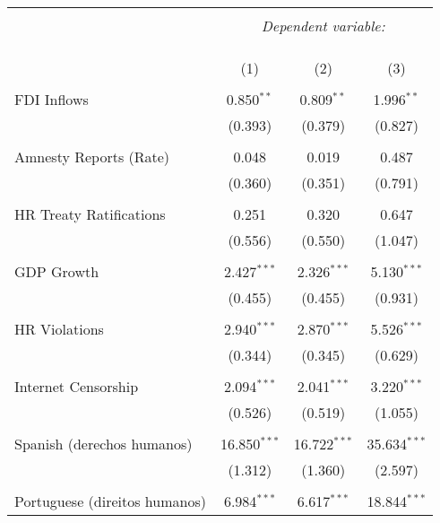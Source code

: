 
\begin{table}[!htbp] \centering 
  \caption{} 
  \label{} 
\begin{tabular}{@{\extracolsep{5pt}}lccc} 
\\[-1.8ex]\hline 
\hline \\[-1.8ex] 
 & \multicolumn{3}{c}{\textit{Dependent variable:}} \\ 
\cline{2-4} 
\\[-1.8ex] & \multicolumn{3}{c}{ } \\ 
\\[-1.8ex] & (1) & (2) & (3)\\ 
\hline \\[-1.8ex] 
 FDI Inflows & 0.850$^{**}$ & 0.809$^{**}$ & 1.996$^{**}$ \\ 
  & (0.393) & (0.379) & (0.827) \\ 
  & & & \\ 
 Amnesty Reports (Rate) & 0.048 & 0.019 & 0.487 \\ 
  & (0.360) & (0.351) & (0.791) \\ 
  & & & \\ 
 HR Treaty Ratifications & 0.251 & 0.320 & 0.647 \\ 
  & (0.556) & (0.550) & (1.047) \\ 
  & & & \\ 
 GDP Growth & 2.427$^{***}$ & 2.326$^{***}$ & 5.130$^{***}$ \\ 
  & (0.455) & (0.455) & (0.931) \\ 
  & & & \\ 
 HR Violations & 2.940$^{***}$ & 2.870$^{***}$ & 5.526$^{***}$ \\ 
  & (0.344) & (0.345) & (0.629) \\ 
  & & & \\ 
 Internet Censorship & 2.094$^{***}$ & 2.041$^{***}$ & 3.220$^{***}$ \\ 
  & (0.526) & (0.519) & (1.055) \\ 
  & & & \\ 
 Spanish (derechos humanos) & 16.850$^{***}$ & 16.722$^{***}$ & 35.634$^{***}$ \\ 
  & (1.312) & (1.360) & (2.597) \\ 
  & & & \\ 
 Portuguese (direitos humanos) & 6.984$^{***}$ & 6.617$^{***}$ & 18.844$^{***}$ \\ 

\end{tabular}
\end{table}
